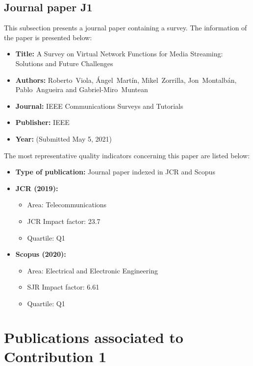 \subsection{Journal paper J1}
\label{chap:IEEECOMST2021}
This subsection presents a journal paper containing a survey.
The information of the paper is presented below:
\begin{itemize} \itemsep1pt\parskip0pt
	\item \textbf{Title:} A Survey on Virtual Network Functions for Media Streaming: Solutions and Future Challenges
	\item \textbf{Authors:} Roberto~Viola, \'Angel~Mart\'in, Mikel~Zorrilla, Jon~Montalb\'an, Pablo~Angueira and Gabriel-Miro~Muntean
	\item \textbf{Journal:} IEEE Communications Surveys and Tutorials
	\item \textbf{Publisher:} IEEE
	\item \textbf{Year:} (Submitted May 5, 2021)
\end{itemize}
The most representative quality indicators concerning this paper are listed below:
\begin{itemize} \itemsep1pt\parskip0pt
	\item \textbf{Type of publication:} Journal paper indexed in JCR and Scopus
	\item \textbf{JCR (2019):}
	\begin{itemize}
		\item Area: Telecommunications
		\item JCR Impact factor: 23.7
		\item Quartile: Q1
	\end{itemize}
	\item \textbf{Scopus (2020):}
	\begin{itemize}
		\item Area: Electrical and Electronic Engineering
		\item SJR Impact factor: 6.61
		\item Quartile: Q1
	\end{itemize}
\end{itemize}


\section{Publications associated to Contribution 1}

